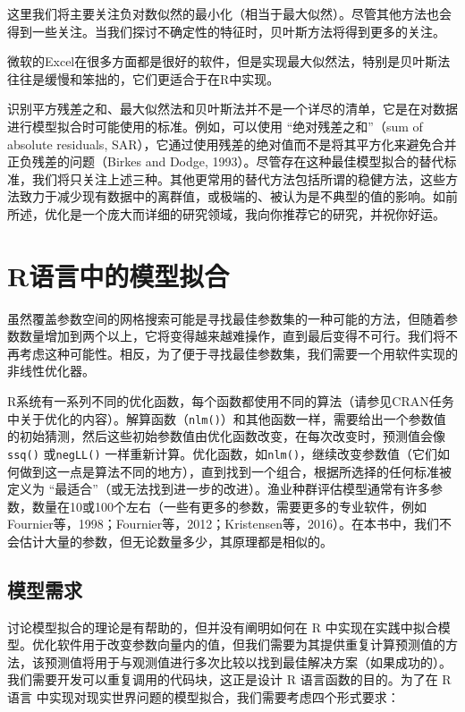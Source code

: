 \documentclass[
  lang=cn,
  11pt,
  scheme=chinese,
  chinesefont=nofont,
  citestyle=gb7714-2015,
  bibstyle=gb7714-2015]{elegantbook}
\begin{document}
这里我们将主要关注负对数似然的最小化（相当于最大似然）。尽管其他方法也会得到一些关注。当我们探讨不确定性的特征时，贝叶斯方法将得到更多的关注。

微软的Excel在很多方面都是很好的软件，但是实现最大似然法，特别是贝叶斯法往往是缓慢和笨拙的，它们更适合于在R中实现。

识别平方残差之和、最大似然法和贝叶斯法并不是一个详尽的清单，它是在对数据进行模型拟合时可能使用的标准。例如，可以使用 ``绝对残差之和''（sum of absolute residuals, SAR），它通过使用残差的绝对值而不是将其平方化来避免合并正负残差的问题（Birkes and Dodge, 1993）。尽管存在这种最佳模型拟合的替代标准，我们将只关注上述三种。其他更常用的替代方法包括所谓的稳健方法，这些方法致力于减少现有数据中的离群值，或极端的、被认为是不典型的值的影响。如前所述，优化是一个庞大而详细的研究领域，我向你推荐它的研究，并祝你好运。

\section{R语言中的模型拟合}\label{rux8bedux8a00ux4e2dux7684ux6a21ux578bux62dfux5408}

虽然覆盖参数空间的网格搜索可能是寻找最佳参数集的一种可能的方法，但随着参数数量增加到两个以上，它将变得越来越难操作，直到最后变得不可行。我们将不再考虑这种可能性。相反，为了便于寻找最佳参数集，我们需要一个用软件实现的非线性优化器。

R系统有一系列不同的优化函数，每个函数都使用不同的算法（请参见CRAN任务中关于优化的内容）。解算函数（\texttt{nlm()}）和其他函数一样，需要给出一个参数值的初始猜测，然后这些初始参数值由优化函数改变，在每次改变时，预测值会像\texttt{ssq()} 或\texttt{negLL()} 一样重新计算。优化函数，如\texttt{nlm()}，继续改变参数值（它们如何做到这一点是算法不同的地方），直到找到一个组合，根据所选择的任何标准被定义为 ``最适合''（或无法找到进一步的改进）。渔业种群评估模型通常有许多参数，数量在10或100个左右（一些有更多的参数，需要更多的专业软件，例如Fournier等，1998；Fournier等，2012；Kristensen等，2016）。在本书中，我们不会估计大量的参数，但无论数量多少，其原理都是相似的。

\subsection{模型需求}\label{ux6a21ux578bux9700ux6c42}

讨论模型拟合的理论是有帮助的，但并没有阐明如何在 R 中实现在实践中拟合模型。优化软件用于改变参数向量内的值，但我们需要为其提供重复计算预测值的方法，该预测值将用于与观测值进行多次比较以找到最佳解决方案（如果成功的）。我们需要开发可以重复调用的代码块，这正是设计 R 语言函数的目的。为了在 R语言 中实现对现实世界问题的模型拟合，我们需要考虑四个形式要求：
\end{document}
